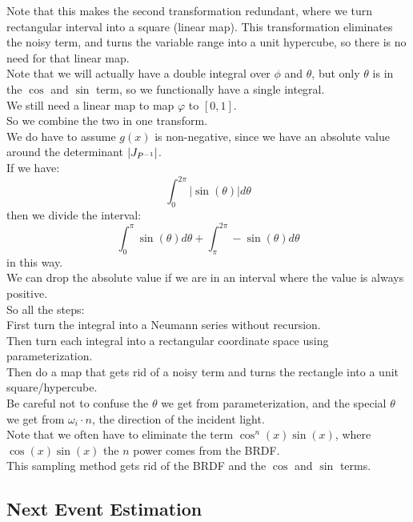 \documentclass[12pt]{article}
\begin{document}
Note that this makes the second transformation
redundant, where we turn rectangular
interval into a square (linear map).
This transformation eliminates the
noisy term, and turns the variable range
into a unit hypercube, so there is no need
for that linear map. \\

Note that we will actually have a double
integral over $\phi$ and $\theta$,
but only $\theta$ is in the $\cos$
and $\sin$ term, so we functionally
have a single integral. \\
We still need a linear map to map $\varphi$
to $[0, 1]$. \\
So we combine the two in one transform. \\

We do have to assume $g(x)$ is non-negative,
since we have an absolute value around the
determinant $|J_{P^{-1}}|$. \\

If we have:
\[ \int_0^{2\pi}|\sin(\theta)|d\theta \]
then we divide the interval:
\[ \int_0^{\pi} \sin(\theta) d\theta 
+ \int_{\pi}^{2\pi} -\sin(\theta) d\theta\]
in this way. \\

We can drop the absolute value if we are
in an interval where the value is always
positive. \\

So all the steps: \\
First turn the integral into a Neumann
series without recursion. \\
Then turn each integral into a rectangular
coordinate space using parameterization. \\
Then do a map that gets rid of a noisy term
and turns the rectangle into a unit square/hypercube. \\

Be careful not to confuse the $\theta$
we get from parameterization,
and the special $\theta$
we get from $\omega_i \cdot n$,
the direction of the incident light. \\

Note that we often have to eliminate the
term $\cos^n(x)\sin(x)$,
where $\cos(x)\sin(x)$
the $n$ power comes from the BRDF. \\

This sampling method gets rid of the BRDF
and the $\cos$ and $\sin$ terms. \\

\newpage

\subsection*{Next Event Estimation}
\end{document}
